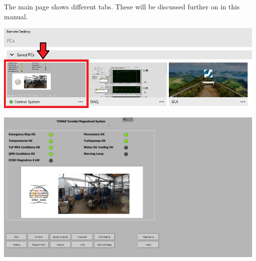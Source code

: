 \documentclass[fleqn,a4paper,20pt]{article}
\begin{document}
The main page shows different tabs. These will be discussed further on in this manual.\\

\begin{minipage}{\textwidth}
	\centering
	\includegraphics[width=\linewidth]{Remote2}
		\label{Remote2}
		\vspace{0.2cm}

	\includegraphics[width=\linewidth]{Remote3}
	\label{Remote3}
\end{minipage}



\newpage
\end{document}
